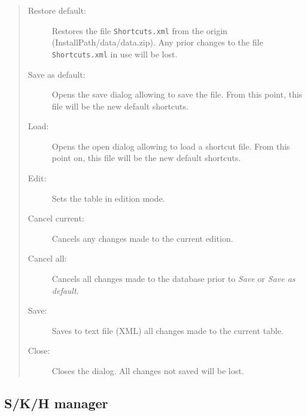 \begin{quote}
  \begin{footnotesize}
    \begin{description}
      \item[Restore default:]
        Restores the file \texttt{Shortcuts.xml} from the origin
        (InstallPath/data/data.zip). Any prior changes to the file
        \texttt{Shortcuts.xml} in use will be lost.
      \item[Save as default:]
        Opens the save dialog allowing to save the file. From this
        point, this file will be the new default shortcuts.
      \item[Load:]
        Opens the open dialog allowing to load a shortcut file. From this
        point on, this file will be the new default shortcuts.
      \item[Edit:]
        Sets the table in edition mode.
      \item[Cancel current:]
        Cancels any changes made to the current edition.
      \item[Cancel all:]
        Cancels all changes made to the database prior to \textit{Save}
        or \textit{Save as default}.
      \item[Save:]
        Saves to text file (XML) all changes made to the current table.
      \item[Close:]
        Closes the dialog. All changes not saved will be lost.
    \end{description}
  \end{footnotesize}
\end{quote}


\hypertarget{dlg_skh_manager}{}
\subsection{S/K/H manager}

